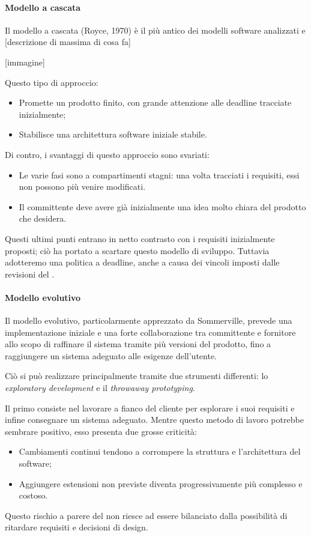 			\paragraph{Modello a cascata}

			Il modello a cascata (Royce, 1970) è il più antico dei modelli software analizzati e [descrizione di massima di cosa fa]

			[immagine]

			Questo tipo di approccio:
\begin{itemize}
\item Promette un prodotto finito, con grande attenzione alle deadline tracciate inizialmente;
\item Stabilisce una architettura software iniziale stabile.
\end{itemize}

			Di contro, i svantaggi di questo approccio sono svariati:
\begin{itemize}
\item Le varie fasi sono a compartimenti stagni: una volta tracciati i requisiti, essi non possono più venire modificati.
\item Il committente deve avere già inizialmente una idea molto chiara del prodotto che desidera. 
\end{itemize}

Questi ultimi punti entrano in netto contrasto con i requisiti inizialmente proposti; ciò ha portato a scartare questo modello di sviluppo. Tuttavia adotteremo una politica a deadline, anche a causa dei vincoli imposti dalle revisioni del {\TV}.

			\paragraph{Modello evolutivo}

			Il modello evolutivo, particolarmente apprezzato da Sommerville, prevede una implementazione iniziale e una forte collaborazione tra committente e fornitore allo scopo di raffinare il sistema tramite più versioni del prodotto, fino a raggiungere un sistema adeguato alle esigenze dell'utente.

Ciò si può realizzare principalmente tramite due strumenti differenti: lo \emph{exploratory development} e il \emph{throwaway prototyping}.

Il primo consiste nel lavorare a fianco del cliente per esplorare i suoi requisiti e infine consegnare un sistema adeguato. Mentre questo metodo di lavoro potrebbe sembrare positivo, esso presenta due grosse criticità: 
\begin{itemize}
\item Cambiamenti continui tendono a corrompere la struttura e l'architettura del software;
\item Aggiungere estensioni non previste diventa progressivamente più complesso e costoso. 
\end{itemize}
Questo rischio a parere del  non riesce ad essere bilanciato dalla possibilità di ritardare requisiti e decisioni di design.

